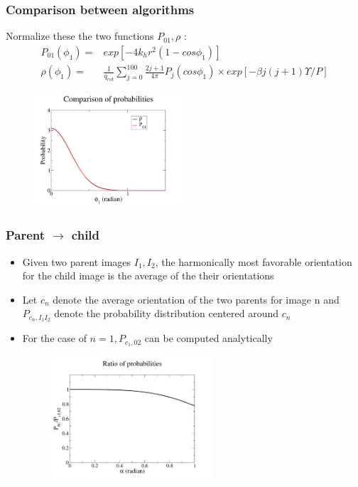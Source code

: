 \documentclass[xcolor=svgnames]{beamer}
\begin{document}
	\begin{frame}
	\frametitle{Comparison between algorithms}
	Normalize these the two functions $P_{01}, \rho$ :
	\begin{align*}
	P_{01} (\phi_1) = &exp [ -4 k_h r^2 (1 - cos \phi_1) ] \\
	\rho(\phi_1) = &\frac{1}{q_{rot}} \displaystyle\sum\limits_{j=0}^{100} \frac{2j+1}{4 \pi} P_j (cos \phi_1) \times exp[- \beta j (j+1)\Upsilon /P]
	\end{align*}       
	\begin{center}
	\begin{figure}
	\includegraphics[width=5.5cm,keepaspectratio]{probabilityComparison.png}
	\end{figure}
	\end{center}
	\end{frame}

	\begin{frame}
	\frametitle{Parent $\to$ child}
	\begin{itemize}%
	\item Given two parent images $I_1,I_2$, the harmonically most favorable orientation for the child image is the average of the their orientations
	\item Let $c_n$ denote the average orientation of the two parents for image n and $P_{c_n,I_1 I_2}$ denote the probability distribution centered around $c_n$ 
	\item For the case of $n = 1, P_{c_1,02}$ can be computed analytically
	\begin{center}
	\begin{figure}
	\includegraphics[width=6cm,keepaspectratio]{yratio.png}
	\end{figure}
	\end{center}
	\end{itemize}
	\end{frame}
\end{document}
